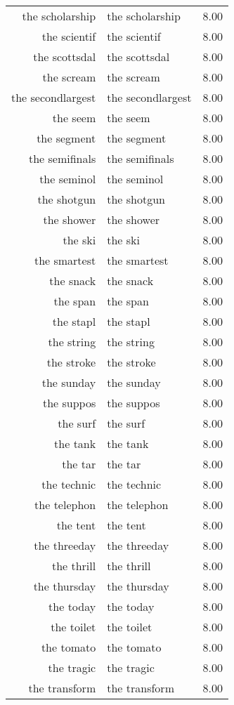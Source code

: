 \begin{table}[ht]
\begin{tabular}{rlr}
  the scholarship & the scholarship & 8.00 \\ 
  the scientif & the scientif & 8.00 \\ 
  the scottsdal & the scottsdal & 8.00 \\ 
  the scream & the scream & 8.00 \\ 
  the secondlargest & the secondlargest & 8.00 \\ 
  the seem & the seem & 8.00 \\ 
  the segment & the segment & 8.00 \\ 
  the semifinals & the semifinals & 8.00 \\ 
  the seminol & the seminol & 8.00 \\ 
  the shotgun & the shotgun & 8.00 \\ 
  the shower & the shower & 8.00 \\ 
  the ski & the ski & 8.00 \\ 
  the smartest & the smartest & 8.00 \\ 
  the snack & the snack & 8.00 \\ 
  the span & the span & 8.00 \\ 
  the stapl & the stapl & 8.00 \\ 
  the string & the string & 8.00 \\ 
  the stroke & the stroke & 8.00 \\ 
  the sunday & the sunday & 8.00 \\ 
  the suppos & the suppos & 8.00 \\ 
  the surf & the surf & 8.00 \\ 
  the tank & the tank & 8.00 \\ 
  the tar & the tar & 8.00 \\ 
  the technic & the technic & 8.00 \\ 
  the telephon & the telephon & 8.00 \\ 
  the tent & the tent & 8.00 \\ 
  the threeday & the threeday & 8.00 \\ 
  the thrill & the thrill & 8.00 \\ 
  the thursday & the thursday & 8.00 \\ 
  the today & the today & 8.00 \\ 
  the toilet & the toilet & 8.00 \\ 
  the tomato & the tomato & 8.00 \\ 
  the tragic & the tragic & 8.00 \\ 
  the transform & the transform & 8.00 \\ 

\end{tabular}
\end{table}

